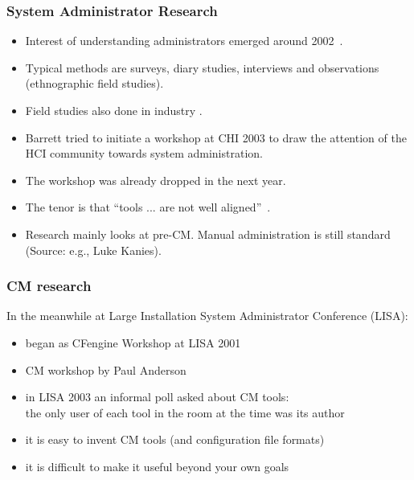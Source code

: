 \begin{frame}
	\frametitle{System Administrator Research}

	\begin{itemize}[<+-| alert@+>]
	\item Interest of understanding administrators emerged around 2002~\cite{anderson2002researching}.
	\item Typical methods are surveys, diary studies, interviews and observations (ethnographic field studies).
	\item Field studies also done in industry \cite{barrett2004field}.
	\item Barrett \cite{barrett2003system} tried to initiate a workshop at CHI 2003 to draw the attention of the HCI community towards system administration.
	\item The workshop was already dropped in the next year.
	\item The tenor is that ``tools ... are not well aligned''~\cite{haber2007design}.
	\item Research mainly looks at pre-CM. Manual administration is still standard \\ (Source: e.g., Luke Kanies).
	\end{itemize}
\end{frame}


\begin{frame}
	\frametitle{CM research}

	In the meanwhile at Large Installation System Administrator Conference (LISA):

	\begin{itemize}[<+-| alert@+>]
	\item began as CFengine Workshop at LISA 2001
	\item CM workshop by Paul Anderson~\cite{anderson2002researching}
	\item in LISA 2003 an informal poll asked about CM tools: \\
	 	the only user of each tool in the room at the time was its author~\cite{burgess2006modeling}
	\item it is easy to invent CM tools (and configuration file formats)
	\item it is difficult to make it useful beyond your own goals
	\end{itemize}
\end{frame}

